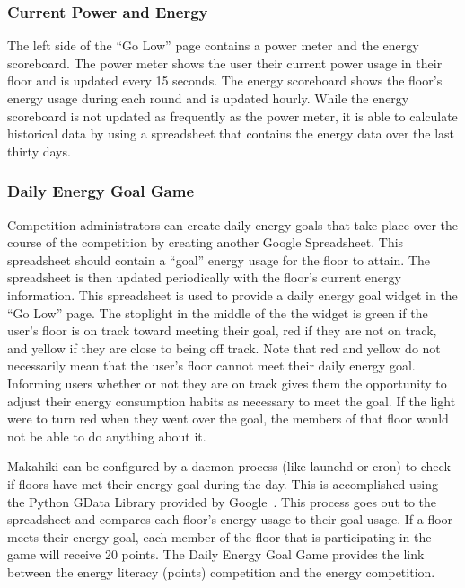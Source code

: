 \subsubsection{Current Power and Energy}
\label{pages-golow:current}

The left side of the ``Go Low'' page contains a power meter and the energy scoreboard.  The power meter shows the user their current power usage in their floor and is updated every 15 seconds.  The energy scoreboard shows the floor's energy usage during each round and is updated hourly.  While the energy scoreboard is not updated as frequently as the power meter, it is able to calculate historical data by using a spreadsheet that contains the energy data over the last thirty days.

\subsubsection{Daily Energy Goal Game}
\label{pages-golow:energygoal}

Competition administrators can create daily energy goals that take place over the course of the competition by creating another Google Spreadsheet.  This spreadsheet should contain a ``goal'' energy usage for the floor to attain.  The spreadsheet is then updated periodically with the floor's current energy information.  This spreadsheet is used to provide a daily energy goal widget in the ``Go Low'' page.  The stoplight in the middle of the the widget is green if the user's floor is on track toward meeting their goal, red if they are not on track, and yellow if they are close to being off track.  Note that red and yellow do not necessarily mean that the user's floor cannot meet their daily energy goal.  Informing users whether or not they are on track gives them the opportunity to adjust their energy consumption habits as necessary to meet the goal.  If the light were to turn red when they went over the goal, the members of that floor would not be able to do anything about it.

Makahiki can be configured by a daemon process (like launchd or cron) to check if floors have met their energy goal during the day.  This is accomplished using the Python GData Library provided by Google~\cite{python-gdata}.  This process goes out to the spreadsheet and compares each floor's energy usage to their goal usage.  If a floor meets their energy goal, each member of the floor that is participating in the game will receive 20 points. The Daily Energy Goal Game provides the link between the energy literacy (points) competition and the energy competition.

